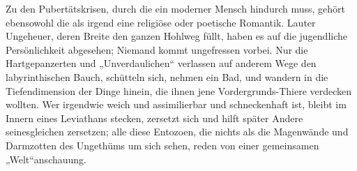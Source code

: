 Zu den Pubertätskrisen, durch die ein moderner Mensch hindurch muss, gehört ebensowohl die  als irgend eine religiöse oder poetische Romantik. Lauter Ungeheuer, deren Breite den ganzen Hohlweg füllt, haben es auf die jugendliche Persönlichkeit abgesehen; Niemand kommt ungefressen vorbei. Nur die Hartgepanzerten und „Unverdaulichen“ verlassen auf anderem Wege den labyrinthischen Bauch, schütteln sich, nehmen ein Bad, und wandern in die Tiefendimension der Dinge hinein, die ihnen jene Vordergrunds-Thiere verdecken wollten. Wer irgendwie weich und assimilierbar und schneckenhaft ist, bleibt im Innern eines Leviathans stecken, zersetzt sich und hilft später Andere seinesgleichen zersetzen; alle diese Entozoen, die nichts als die Magenwände und Darmzotten des Ungethüms um sich sehen, reden von einer gemeinsamen „Welt“anschauung.
\par

